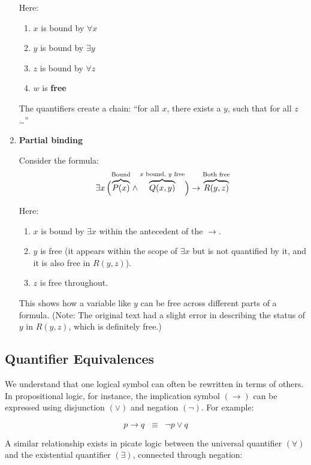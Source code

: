 \documentclass[12pt,a4paper,openany]{article}
\begin{document}
\begin{enumerate}
    Here:
    \begin{enumerate}
        \item $x$ is bound by $\forall x$
        \item $y$ is bound by $\exists y$
        \item $z$ is bound by $\forall z$
        \item $w$ is \textbf{free}
    \end{enumerate}
    The quantifiers create a chain: ``for all $x$, there exists a $y$, such that for all $z$\ldots''
\item
    \textbf{Partial binding}

    Consider the formula:
    \[
    \exists x \,
    \Big(
    {\color{black}\overbrace{\color{black}P(x)}^{\color{black}\text{Bound}}} \wedge
    {\color{black}\overbrace{\color{black}Q(x, y)}^{\color{black}x \text{ bound, } y \text{ free}}}
    \Big) \rightarrow
    {\color{black}\overbrace{\color{black}R(y, z)}^{\color{black}\text{Both free}}}
    \]

    Here:
    \begin{enumerate}
        \item $x$ is bound by $\exists x$ within the antecedent of the $\rightarrow$.
        \item $y$ is free (it appears within the scope of $\exists x$ but is not quantified by it, and it is also free in $R(y,z)$).
        \item $z$ is free throughout.
    \end{enumerate}
    This shows how a variable like $y$ can be free across different parts of a formula. (Note: The original text had a slight error in describing the status of $y$ in $R(y,z)$, which is definitely free.)
\end{enumerate}

\subsection{Quantifier Equivalences}\label{quantifier-equivalences}

We understand that one logical symbol can often be rewritten in terms of
others. In propositional logic, for instance, the implication symbol
\((\rightarrow)\) can be expressed using disjunction \((\lor)\) and
negation \((\lnot)\). For example:

\[
p \rightarrow q \;\;\equiv\;\; \lnot p \lor q
\]

A similar relationship exists in picate logic between the universal
quantifier \((\forall)\) and the existential quantifier \((\exists)\),
connected through negation:
\end{document}
